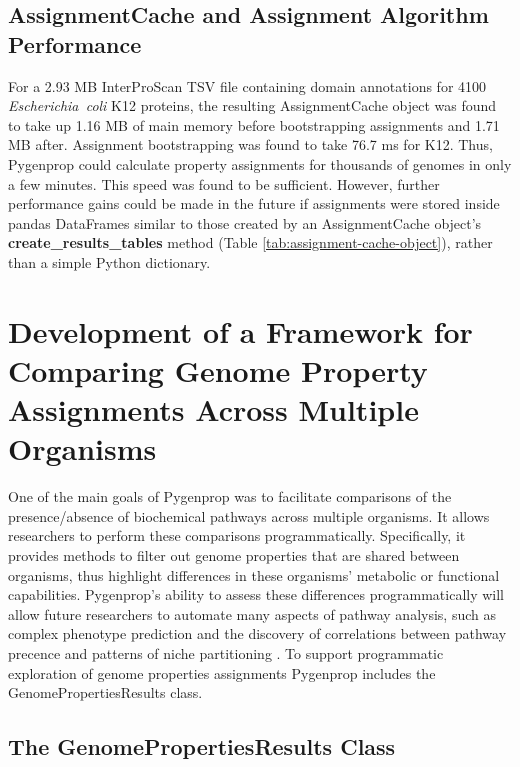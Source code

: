 \subsection{AssignmentCache and Assignment Algorithm Performance} \label{AssignmentCache-Performance}

For a 2.93 MB InterProScan TSV file containing domain annotations for 4100 \textit{Escherichia\ coli} K12 proteins, the resulting AssignmentCache object was found to take up 1.16 MB of main memory before bootstrapping assignments and 1.71 MB after. Assignment bootstrapping was found to take 76.7  ms for K12. Thus, Pygenprop could calculate property assignments for thousands of genomes in only a few minutes. This speed was found to be sufficient. However, further performance gains could be made in the future if assignments were stored inside pandas DataFrames \cite{mckinney2010data} similar to those created by an AssignmentCache object's \textbf{create\_results\_tables} method (Table \ref{tab:assignment-cache-object}), rather than a simple Python dictionary.

\section{Development of a Framework for Comparing Genome Property Assignments Across Multiple Organisms} \label{GenomePropertiesResults}

One of the main goals of Pygenprop was to facilitate comparisons of the presence/absence of biochemical pathways across multiple organisms. It allows researchers to perform these comparisons programmatically. Specifically, it provides methods to filter out genome properties that are shared between organisms, thus highlight differences in these organisms' metabolic or functional capabilities. Pygenprop's ability to assess these differences programmatically will allow future researchers to automate many aspects of pathway analysis, such as complex phenotype prediction and the discovery of correlations between pathway precence and patterns of niche partitioning \cite{finke2008niche}. To support programmatic exploration of genome properties assignments Pygenprop includes the GenomePropertiesResults class. 

\subsection{The GenomePropertiesResults Class}

